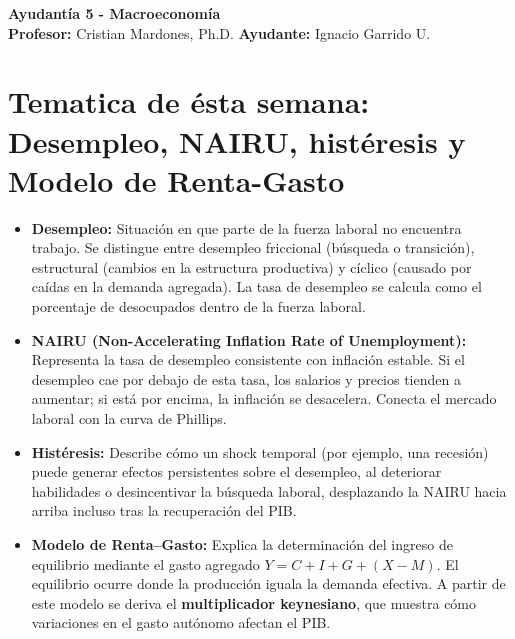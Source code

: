 \documentclass[11pt,addpoints]{article}
\begin{document}
\vspace*{0.01cm}

\begin{center}
{\Large \bfseries Ayudantía 5 - Macroeconomía \\[0.5cm]}
\textbf{Profesor:} Cristian Mardones, Ph.D. \quad \textbf{Ayudante:} Ignacio Garrido U.
\end{center}

\section*{\textbf{Tematica de ésta semana: Desempleo, NAIRU, histéresis y Modelo de Renta-Gasto}}
\begin{itemize}
    \item \textbf{Desempleo:} Situación en que parte de la fuerza laboral no encuentra trabajo. Se distingue entre desempleo friccional (búsqueda o transición), estructural (cambios en la estructura productiva) y cíclico (causado por caídas en la demanda agregada). La tasa de desempleo se calcula como el porcentaje de desocupados dentro de la fuerza laboral.
    
    \item \textbf{NAIRU (Non-Accelerating Inflation Rate of Unemployment):} Representa la tasa de desempleo consistente con inflación estable. Si el desempleo cae por debajo de esta tasa, los salarios y precios tienden a aumentar; si está por encima, la inflación se desacelera. Conecta el mercado laboral con la curva de Phillips.
    
    \item \textbf{Histéresis:} Describe cómo un shock temporal (por ejemplo, una recesión) puede generar efectos persistentes sobre el desempleo, al deteriorar habilidades o desincentivar la búsqueda laboral, desplazando la NAIRU hacia arriba incluso tras la recuperación del PIB.
    
    \item \textbf{Modelo de Renta–Gasto:} Explica la determinación del ingreso de equilibrio mediante el gasto agregado \(Y = C + I + G + (X - M)\). El equilibrio ocurre donde la producción iguala la demanda efectiva. A partir de este modelo se deriva el \textbf{multiplicador keynesiano}, que muestra cómo variaciones en el gasto autónomo afectan el PIB.
\end{itemize}
\end{document}

